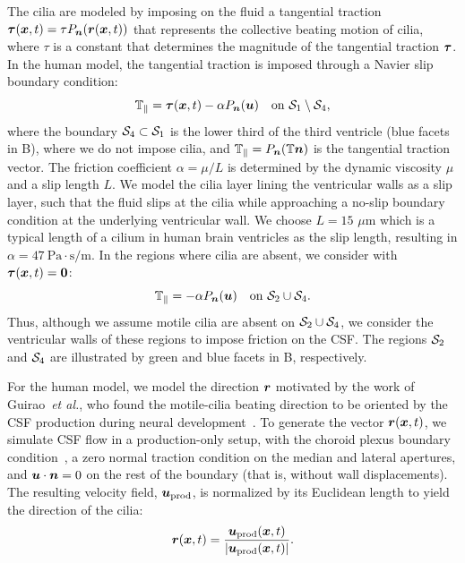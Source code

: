 \documentclass{template}
\begin{document}
The cilia are modeled by imposing on the fluid a
tangential traction $\bm{\tau}(\bm{x}, t) = \tau P_{\bm{n}}(\bm{r}(\bm{x}, t))$
that represents the collective beating motion of cilia,
where $\tau$ is a constant that determines the 
magnitude of the tangential traction $\bm{\tau}$.
In the human model, the tangential traction is
imposed through a Navier slip boundary condition:
\begin{equation}
    \mathbb{T}_{\parallel} = \bm{\tau}(\bm{x}, t) - \alpha P_{\bm{n}}(\bm{u})
    \quad\text{on }\mathcal{S}_1\setminus\mathcal{S}_4,
    \label{eq:cilia_navier_slip_bc}
\end{equation}
where the boundary $\mathcal{S}_4\subset\mathcal{S}_1$ is the lower third of
the third ventricle (blue facets in B),
where we do not impose cilia, and
$\mathbb{T}_{\parallel} = P_{\bm{n}}(\mathbb{T}\bm{n})$ is the
tangential traction vector. The friction coefficient $\alpha=\mu/L$ 
is determined by the dynamic viscosity $\mu$ and a slip length $L$.
We model the cilia layer lining the ventricular walls
as a slip layer, such that the fluid slips at the cilia while
approaching a no-slip boundary condition at the underlying
ventricular wall. We choose $L=15$ $\mu$m
which is a typical length of a cilium in human brain ventricles
\cite{Siyahhan2014FlowVentricles,Afzelius2004CiliaRelatedDiseases}
as the slip length, resulting in $\alpha=47 \ \mathrm{Pa\cdot s/m}$.
In the regions where cilia are absent, we consider
 with $\bm{\tau}(\bm{x}, t) = \bm{0}$:
\begin{equation}
    \mathbb{T}_{\parallel} = - \alpha P_{\bm{n}}(\bm{u})
    \quad\text{on }\mathcal{S}_2\cup\mathcal{S}_4.
    \label{eq:navier_slip_bc}
\end{equation}
Thus, although we assume motile cilia are absent on $\mathcal{S}_2\cup\mathcal{S}_4$,
we consider the ventricular walls of these regions to impose friction on the CSF.
The regions $\mathcal{S}_2$ and $\mathcal{S}_4$ are illustrated by
green and blue facets in B, respectively.

For the human model, we model the direction $\bm{r}$
motivated by the work of Guirao~\emph{et al.},
who found the motile-cilia beating direction to be oriented by the
CSF production during neural development~\cite{Guirao2010CouplingCilia}.
To generate the vector $\bm{r}(\bm{x}, t)$, we simulate CSF flow in a production-only
setup, with the choroid plexus boundary condition~,
a zero normal traction condition on the median and lateral apertures,
and $\bm{u}\cdot\bm{n}=0$ on the rest of the boundary (that is, without wall displacements). 
The resulting velocity field,
$\bm{u}_{\mathrm{prod}}$, is normalized by its Euclidean length
to yield the direction of the cilia:
\begin{equation*}
    \bm{r}(\bm{x}, t) = \frac{\bm{u}_{\mathrm{prod}}(\bm{x}, t)}{|\bm{u}_{\mathrm{prod}}(\bm{x}, t)|}.
\end{equation*}
\end{document}
